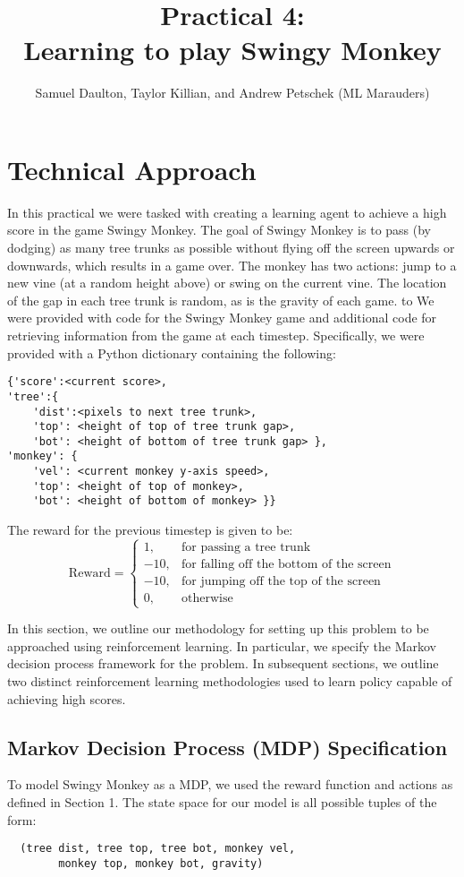 \documentclass[11pt, oneside]{article}   	%
\title{Practical 4:\\
 Learning to play Swingy Monkey}
\author{Samuel Daulton, Taylor Killian, and Andrew Petschek (ML Marauders)}
\begin{document}
\maketitle
\section{Technical Approach}
In this practical we were tasked with creating a learning agent to achieve a high score in the game Swingy Monkey. The goal of Swingy Monkey is to pass (by dodging) as many tree trunks as possible without flying off the screen upwards or downwards, which results in a game over.  The monkey has two actions: jump to a new vine (at a random height above) or swing on the current vine.   The location of the gap in each tree trunk is random, as is the gravity of each game.  to We were provided with code for the Swingy Monkey game and additional code for retrieving information from the game at each timestep.  Specifically, we were provided with a Python dictionary containing the following:
\begin{verbatim}
{'score':<current score>,
'tree':{
    'dist':<pixels to next tree trunk>,
    'top': <height of top of tree trunk gap>,
    'bot': <height of bottom of tree trunk gap> },
'monkey': {
    'vel': <current monkey y-axis speed>,
    'top': <height of top of monkey>,
    'bot': <height of bottom of monkey> }}
\end{verbatim}
The reward for the previous timestep is given to be:
$$
\text{Reward} =
\begin{cases}
1, & \text{for passing a tree trunk} \\
-10, & \text{for falling off the bottom of the screen}\\
-10, & \text{for jumping off the top of the screen}\\
0, & \text{otherwise}
\end{cases}
$$


In this section, we outline our methodology for setting up this problem to be approached using reinforcement learning.  In particular, we specify the Markov decision process framework for the problem.  In subsequent sections, we outline two distinct reinforcement learning methodologies used to learn policy capable of achieving high scores.  
\subsection{Markov Decision Process (MDP) Specification}
To model Swingy Monkey as a MDP, we used the reward function and actions as defined in Section 1.  The state space for our model is all possible tuples of the form:                                                                                                                                                                  
\begin{verbatim}
  (tree dist, tree top, tree bot, monkey vel,
        monkey top, monkey bot, gravity)
\end{verbatim}
\end{document}
